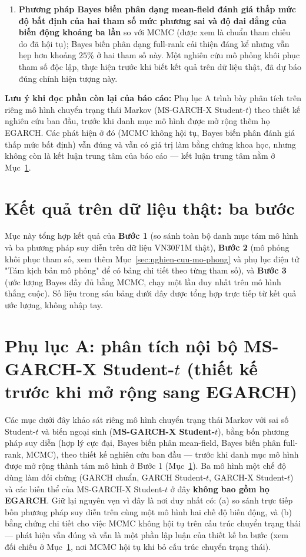 \documentclass[11pt,a4paper]{article}
\begin{document}
{\begin{enumerate}[leftmargin=1.6em,itemsep=0.25em,topsep=0.3em]
  \item \textbf{Phương pháp Bayes biến phân dạng mean-field đánh giá thấp mức độ bất định của hai tham số mức phương sai và độ dai dẳng của biến động khoảng ba lần} so với MCMC (được xem là chuẩn tham chiếu do đã hội tụ); Bayes biến phân dạng full-rank cải thiện đáng kể nhưng vẫn hẹp hơn khoảng $25\%$ ở hai tham số này. Một nghiên cứu mô phỏng khôi phục tham số độc lập, thực hiện trước khi biết kết quả trên dữ liệu thật, đã dự báo đúng chính hiện tượng này.
\end{enumerate}
\textbf{Lưu ý khi đọc phần còn lại của báo cáo:} Phụ lục A trình bày phân tích trên riêng mô hình chuyển trạng thái Markov (MS-GARCH-X Student-$t$) theo thiết kế nghiên cứu ban đầu, trước khi danh mục mô hình được mở rộng thêm họ EGARCH. Các phát hiện ở đó (MCMC không hội tụ, Bayes biến phân đánh giá thấp mức bất định) vẫn đúng và vẫn có giá trị làm bằng chứng khoa học, nhưng không còn là kết luận trung tâm của báo cáo --- kết luận trung tâm nằm ở Mục~\ref{sec:ket-qua-ba-buoc}.
}

\section{Kết quả trên dữ liệu thật: ba bước}
\label{sec:ket-qua-ba-buoc}

Mục này tổng hợp kết quả của \textbf{Bước 1} (so sánh toàn bộ danh mục tám mô
hình và ba phương pháp suy diễn trên dữ liệu VN30F1M thật), \textbf{Bước 2}
(mô phỏng khôi phục tham số, xem thêm Mục~\ref{sec:nghien-cuu-mo-phong} và
phụ lục điện tử "Tám kịch bản mô phỏng" để có bảng chi tiết theo từng tham
số), và \textbf{Bước 3} (ước lượng Bayes đầy đủ bằng MCMC, chạy một lần duy
nhất trên mô hình thắng cuộc). Số liệu trong sáu bảng dưới đây được tổng hợp
trực tiếp từ kết quả ước lượng, không nhập tay.




\section{Phụ lục A: phân tích nội bộ MS-GARCH-X Student-$t$ (thiết kế trước khi mở rộng sang EGARCH)}

Các mục dưới đây khảo sát riêng mô hình chuyển trạng thái Markov với sai số
Student-$t$ và biến ngoại sinh (\textbf{MS-GARCH-X Student-$t$}), bằng bốn
phương pháp suy diễn (hợp lý cực đại, Bayes biến phân mean-field, Bayes biến
phân full-rank, MCMC), theo thiết kế nghiên cứu ban đầu --- trước khi danh
mục mô hình được mở rộng thành tám mô hình ở Bước 1 (Mục~\ref{sec:ket-qua-ba-buoc}).
Ba mô hình một chế độ dùng làm đối chứng (GARCH chuẩn, GARCH Student-$t$,
GARCH-X Student-$t$) và các biến thể của MS-GARCH-X Student-$t$ ở đây
\textbf{không bao gồm họ EGARCH}. Giữ lại nguyên vẹn vì đây là nơi duy nhất
có: (a) so sánh trực tiếp bốn phương pháp suy diễn trên cùng một mô hình hai
chế độ biến động, và (b) bằng chứng chi tiết cho việc MCMC không hội tụ trên
cấu trúc chuyển trạng thái --- phát hiện vẫn đúng và vẫn là một phần lập luận
của thiết kế ba bước (xem đối chiếu ở Mục~\ref{sec:ket-qua-ba-buoc}, nơi MCMC
hội tụ khi bỏ cấu trúc chuyển trạng thái).
\end{document}
